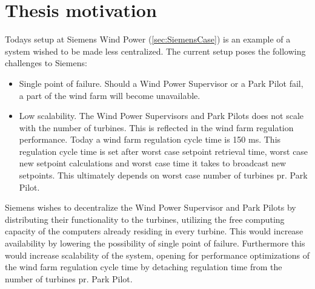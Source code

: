 %	
%		
%	
%					
%

\section{Thesis motivation}
\label{sec:ThesisMotivation}
Todays setup at Siemens Wind Power (\cref{sec:SiemensCase}) is an example of a system wished to be made less centralized. The current setup poses the following challenges to Siemens:  

\begin{itemize} 
	\item Single point of failure. Should a Wind Power Supervisor or a Park Pilot fail, a part of the wind farm will become unavailable.
	\item Low scalability. The Wind Power Supervisors and Park Pilots does not scale with the number of turbines. This is reflected in the wind farm regulation performance. Today a wind farm regulation cycle time is 150 ms. This regulation cycle time is set after worst case setpoint retrieval time, worst case new setpoint calculations and worst case time it takes to broadcast new setpoints. This ultimately depends on worst case number of turbines pr. Park Pilot.
\end{itemize}

Siemens wishes to decentralize the Wind Power Supervisor and Park Pilots by distributing their functionality to the turbines, utilizing the free computing capacity of the computers already residing in every turbine. This would increase availability by lowering the possibility of single point of failure. Furthermore this would increase scalability of the system, opening for performance optimizations of the wind farm regulation cycle time by detaching regulation time from the number of turbines pr. Park Pilot. 


